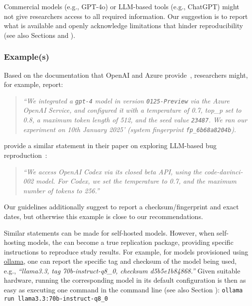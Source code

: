 Commercial models (e.g., GPT-4o) or LLM-based tools (e.g., ChatGPT) might not give researchers access to all required information.
Our suggestion is to report what is available and openly acknowledge limitations that hinder reproducibility (see also Sections \prompts and \limitationsmitigations).

\subsubsection{Example(s)}

Based on the documentation that OpenAI and Azure provide~\cite{OpenAI25, Azure25}, researchers might, for example, report:

\begin{quote}
\small
\it
 ``We integrated a  \texttt{gpt-4} model in version \texttt{0125-Preview} via the Azure OpenAI Service, and configured it with a temperature of 0.7, top\_p set to 0.8, a maximum token length of 512, and the  seed value \texttt{23487}.
 We ran our experiment on 10th January 2025' (system fingerprint \texttt{fp\_6b68a8204b}).
\end{quote}

\citeauthor{DBLP:conf/icse/KangYY23} provide a similar statement in their paper on exploring LLM-based bug reproduction~\cite{DBLP:conf/icse/KangYY23}:

\begin{quote}
\small
\it
``We access OpenAI Codex via its closed beta API, using the code-davinci-002 model. For Codex, we set the temperature to 0.7, and the maximum number of tokens to 256.''
\end{quote}

Our guidelines additionally suggest to report a checksum/fingerprint and exact dates, but otherwise this example is close to our recommendations. 

Similar statements can be made for self-hosted models.
However, when self-hosting models, the \supplementarymaterial can become a true replication package, providing specific instructions to reproduce study results.
For example, for models provisioned using \href{https://ollama.com/library/}{ollama}, one can report the specific tag and checksum of the model being used, e.g., \emph{``llama3.3, tag 70b-instruct-q8\_0, checksum d5b5e1b84868.''}
Given suitable hardware, running the corresponding model in its default configuration is then as easy as executing one command in the command line (see also Section \openllm):
\texttt{ollama run llama3.3:70b-instruct-q8\_0}

